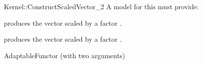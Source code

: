 \begin{ccRefFunctionObjectConcept}{Kernel::ConstructScaledVector_2}
A model for this must provide:



            {produces the vector  scaled by a factor .}

            {produces the vector  scaled by a factor .}


\ccRefines
AdaptableFunctor (with two arguments)

\ccSeeAlso
{}\\

\end{ccRefFunctionObjectConcept}
